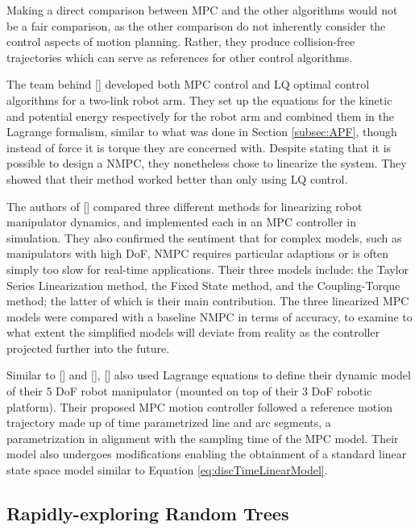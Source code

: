 Making a direct comparison between \gls{MPC} and the other algorithms would not be a fair comparison, as the other comparison do not inherently consider the control aspects of motion planning. Rather, they produce collision-free trajectories which can serve as references for other control algorithms.

The team behind [\citeauthor{Guechi2018}] developed both \gls{MPC} control and \gls{LQ} optimal control algorithms for a two-link robot arm. They set up the equations for the kinetic and potential energy respectively for the robot arm and combined them in the Lagrange formalism, similar to what was done in Section \ref{subsec:APF}, though instead of force it is torque they are concerned with. Despite stating that it is possible to design a \gls{NMPC}, they nonetheless chose to linearize the system. They showed that their method worked better than only using \gls{LQ} control.

The authors of [\citeauthor{Terry2017}] compared three different methods for linearizing robot manipulator dynamics, and implemented each in an \gls{MPC} controller in simulation. They also confirmed the sentiment that for complex models, such as manipulators with high \gls{DoF}, \gls{NMPC} requires particular adaptions or is often simply too slow for real-time applications. Their three models include: the Taylor Series Linearization method, the Fixed State method, and the Coupling-Torque method; the latter of which is their main contribution. The three linearized \gls{MPC} models were compared with a baseline \gls{NMPC} in terms of accuracy, to examine to what extent the simplified models will deviate from reality as the controller projected further into the future.

Similar to [\citeauthor{Guechi2018}] and [\citeauthor{Terry2017}], [\citeauthor{Rovny2017}] also used Lagrange equations to define their dynamic model of their 5 \gls{DoF} robot manipulator (mounted on top of their 3 \gls{DoF} robotic platform). Their proposed \gls{MPC} motion controller followed a reference motion trajectory made up of time parametrized line and arc segments, a parametrization in alignment with the sampling time of the \gls{MPC} model. Their model also undergoes modifications enabling the obtainment of a standard linear state space model similar to Equation \ref{eq:discTimeLinearModel}.

\subsection{Rapidly-exploring Random Trees} \label{subsec:RRT}

